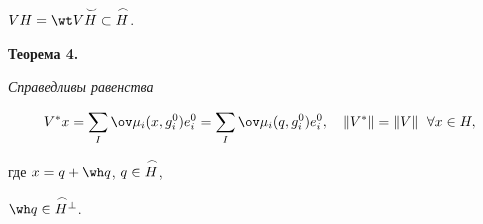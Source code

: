  


\begin{cor} 


$V H=\wt V\up{\smile}{H}\subset\up{\frown}{H}$. 


\end{cor} 


 


{\bf Теорема 4.} {\it Справедливы равенства


\begin{equation} 


V^*x=\sum_I\ov\mu_i(x,g^0_i)e^0_i= 


\sum_I\ov \mu_i(q,g^0_i)e^0_i,\quad \|V^*\|=\|V\| 


\ \; \forall x\in H,


\end{equation} 


где $x=q+\wh q$, $q\in\overset{\,\frown}{H}{}$,


$\wh q\in\up{\frown}{H}^\bot$.}


\addtocounter{thm}{1} 


 


